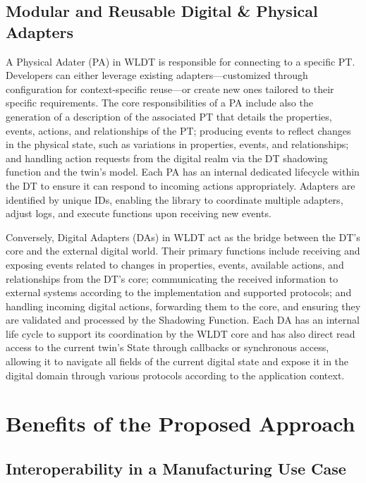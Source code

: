 \subsection{Modular and Reusable Digital \& Physical Adapters}
\label{subsec:adapters}

A Physical Adater (PA) in WLDT is responsible for connecting to a specific PT. 
Developers can either leverage existing adapters—customized through configuration for context-specific reuse—or create new ones tailored to their specific requirements.
The core responsibilities of a PA include also the generation of a description of the associated PT that details the properties, events, actions, and relationships of the PT; producing events to reflect changes in the physical state, such as variations in properties, events, and relationships; and handling action requests from the digital realm via the DT shadowing function and the twin's model.
Each PA has an internal dedicated lifecycle within the DT to ensure it can respond to incoming actions appropriately. Adapters are identified by unique IDs, enabling the library to coordinate multiple adapters, adjust logs, and execute functions upon receiving new events. 

Conversely, Digital Adapters (DAs) in WLDT act as the bridge between the DT's core and the external digital world.
Their primary functions include receiving and exposing events related to changes in properties, events, available actions, and relationships from the DT’s core;
communicating the received information to external systems according to the implementation and supported protocols;
and handling incoming digital actions, forwarding them to the core, and ensuring they are validated and processed by the Shadowing Function.
Each DA has an internal life cycle to support its coordination by the WLDT core and has also direct read access to the current twin's State through callbacks or synchronous access, allowing it to navigate all fields of the current digital state and expose it in the digital domain through various protocols according to the application context.


\section{Benefits of the Proposed Approach}

\subsection{Interoperability in a Manufacturing Use Case}
\label{sec:industrial_use_case}

